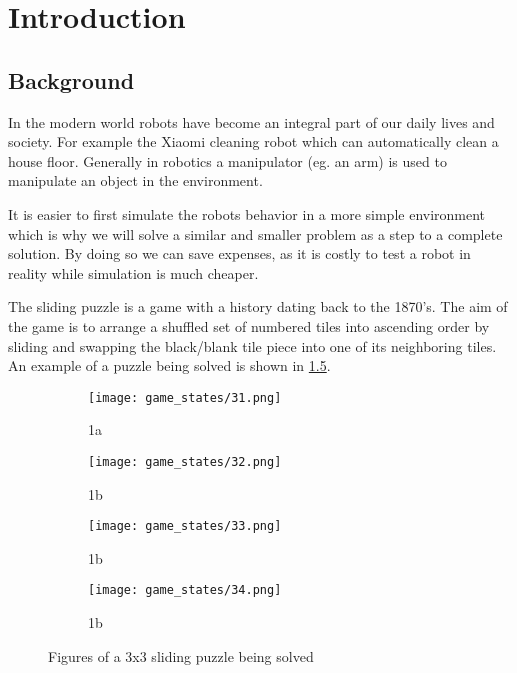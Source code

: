 \graphicspath{{introduction/fig/}}

\chapter{Introduction}
\label{chap:introduction}

\section{Background}
In the modern world robots have become an integral part of our daily lives and society. For example the Xiaomi cleaning robot which can automatically clean a house floor.
Generally in robotics a manipulator (eg.
an arm) is used to manipulate an object in
the environment.

It is easier to first simulate the robots behavior in a
more simple environment which is why we will solve a similar and smaller problem as a step to a complete solution. By doing so we can save expenses, as it is costly to test a robot in reality while simulation is much cheaper. \newline

The sliding puzzle is a game with a history dating back to the 1870's. The aim of the game is to arrange a shuffled set of numbered tiles into ascending order by sliding and swapping the black/blank tile piece into one of its neighboring tiles. An example of a puzzle being solved is shown in \ref{fig:sliding_puzzle_figs}.

\begin{figure}[!htb]
	\centering
	\begin{subfigure}{.2\textwidth}
		\centering
		\texttt{[image: game\_states/31.png]}
		\caption{1a}
		\label{fig:sfig1}
	\end{subfigure}%
	\begin{subfigure}{.2\textwidth}
		\centering
		\texttt{[image: game\_states/32.png]}
		\caption{1b}
		\label{fig:sfig2}
	\end{subfigure}
	\begin{subfigure}{.2\textwidth}
		\centering
		\texttt{[image: game\_states/33.png]}
		\caption{1b}
		\label{fig:sfig3}
	\end{subfigure}
	\begin{subfigure}{.2\textwidth}
		\centering
		\texttt{[image: game\_states/34.png]}
		\caption{1b}
		\label{fig:sfig4}
	\end{subfigure}
	\caption{Figures of a 3x3 sliding puzzle being solved}
	\label{fig:sliding_puzzle_figs}
\end{figure}

